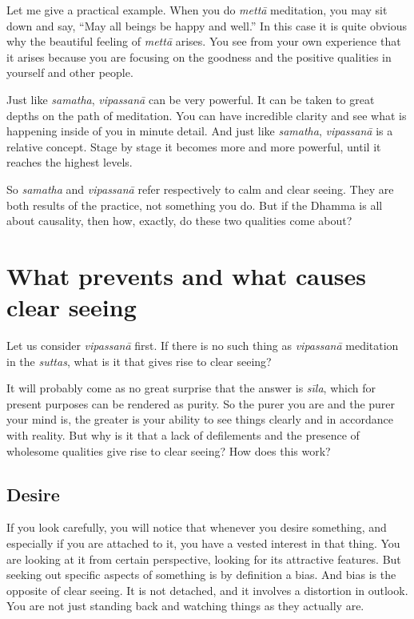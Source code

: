 \documentclass[12pt,openany]{book}
\begin{document}
Let me give a practical example. When you do \textit{mettā} meditation, you may sit down and say, “May all beings be happy and well.” In this case it is quite obvious why the beautiful feeling of \textit{mettā} arises. You see from your own experience that it arises because you are focusing on the goodness and the positive qualities in yourself and other people.

Just like \textit{samatha}, \textit{vipassanā} can be very powerful. It can be taken to great depths on the path of meditation. You can have incredible clarity and see what is happening inside of you in minute detail. And just like \textit{samatha}, \textit{vipassanā} is a relative concept. Stage by stage it becomes more and more powerful, until it reaches the highest levels.

So \textit{samatha} and \textit{vipassanā} refer respectively to calm and clear seeing. They are both results of the practice, not something you do. But if the Dhamma is all about causality, then how, exactly, do these two qualities come about?

\chapter*{What prevents and what causes clear seeing}

Let us consider \textit{vipassanā} first. If there is no such thing as \textit{vipassanā} meditation in the \textit{suttas}, what is it that gives rise to clear seeing?

It will probably come as no great surprise that the answer is \textit{sīla}, which for present purposes can be rendered as purity. So the purer you are and the purer your mind is, the greater is your ability to see things clearly and in accordance with reality. But why is it that a lack of defilements and the presence of wholesome qualities give rise to clear seeing? How does this work?

\section*{Desire}

If you look carefully, you will notice that whenever you desire something, and especially if you are attached to it, you have a vested interest in that thing. You are looking at it from certain perspective, looking for its attractive features. But seeking out specific aspects of something is by definition a bias. And bias is the opposite of clear seeing. It is not detached, and it involves a distortion in outlook. You are not just standing back and watching things as they actually are.
\end{document}

